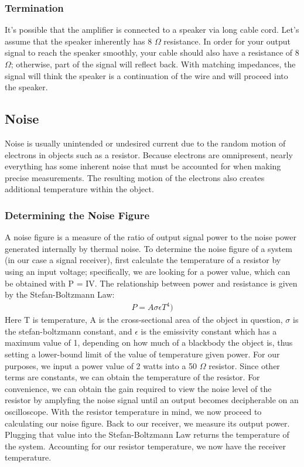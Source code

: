 \documentclass[12pt]{article}
\begin{document}
\subsubsection{Termination}
It's possible that the amplifier is connected to a speaker via long
cable cord. Let's assume that the speaker inherently has 8 $\Omega$
resistance. In order for your output signal to reach the speaker
smoothly, your cable should also have a resistance of 8 $\Omega$;
otherwise, part of the signal will reflect back. With matching
impedances, the signal will think the speaker is a continuation of the
wire and will proceed into the speaker. 

\subsection{Noise}
Noise is usually unintended or undesired current due to the random
motion of electrons in objects such as a resistor. Because electrons are
omnipresent, nearly everything has some inherent noise that must be
accounted for when making precise measurements. The resulting motion of
the electrons also creates additional temperature within the object.
\subsubsection{Determining the Noise Figure}
A noise figure is a measure of the ratio of output signal power to the
noise power generated internally by thermal noise. To determine the
noise figure of a system (in our case a signal receiver), first calculate the
temperature of a resistor by using an input voltage; specifically, we
are looking for a power value, which can be obtained with P = IV. The
relationship between power and resistance is given by the
Stefan-Boltzmann Law:
\begin{align}P = A\sigma{\epsilon{T^4)}}\end{align}
Here T is temperature, A is the cross-sectional area of the object in
question, $\sigma$ is the stefan-boltzmann constant, and $\epsilon$ is
the emissivity constant which has a maximum value of 1, depending on how
much of a blackbody the object is, thus setting a
lower-bound limit of the value  of temperature given power. For our purposes, we input
a power value of 2 watts into a 50 $\Omega$ resistor. Since other terms
are constants, we can obtain the temperature of the resistor. For
convenience, we can obtain the gain required to view the noise level of
the resistor by amplyfing the noise signal until an output becomes
decipherable on an oscilloscope. With the resistor temperature in mind,
we now proceed to calculating our noise figure. Back to our receiver,
we measure its output power. Plugging that value into the
Stefan-Boltzmann Law returns the temperature of the system. Accounting
for our resistor temperature, we now have the receiver temperature. 
\end{document}
